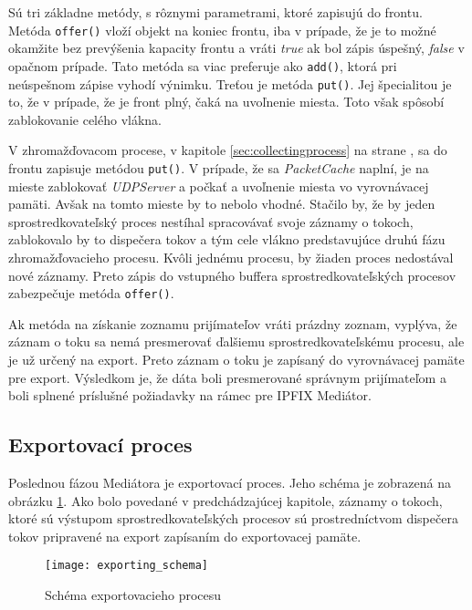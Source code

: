 Sú tri základne metódy, s rôznymi parametrami, ktoré zapisujú do frontu.
Metóda \verb|offer()| vloží objekt na koniec frontu, iba v prípade, že je to možné 
okamžite bez prevýšenia kapacity frontu a vráti \emph{true} ak bol zápis úspešný, \emph{false} v 
opačnom prípade. Tato metóda sa viac preferuje ako \verb|add()|, ktorá pri neúspešnom zápise 
vyhodí výnimku. Treťou je metóda \verb|put()|. Jej špecialitou je to, že v prípade, že je front plný,
čaká na uvoľnenie miesta. Toto však spôsobí zablokovanie celého vlákna. \citep{arrayblockingqueue}

V zhromažďovacom procese, v kapitole \ref{sec:collectingprocess} na strane \pageref{sec:collectingprocess},
sa do frontu zapisuje metódou \verb|put()|. V prípade, že sa \emph{PacketCache} naplní, je na mieste 
zablokovať \emph{UDPServer} a počkať a uvoľnenie miesta vo vyrovnávacej pamäti. Avšak na tomto mieste by 
to nebolo vhodné. Stačilo by, že by jeden sprostredkovateľský proces nestíhal spracovávať svoje záznamy
o tokoch, zablokovalo by to dispečera tokov a tým cele vlákno predstavujúce druhú fázu zhromažďovacieho
procesu. Kvôli jednému procesu, by žiaden proces nedostával nové záznamy. Preto zápis do vstupného buffera
sprostredkovateľských procesov zabezpečuje metóda \verb|offer()|.

Ak metóda na získanie zoznamu prijímateľov vráti prázdny zoznam, vyplýva, že záznam o toku 
sa nemá presmerovať ďalšiemu sprostredkovateľskému procesu, ale je už určený na export. Preto záznam o 
toku je zapísaný do vyrovnávacej pamäte pre export. Výsledkom je, že dáta boli presmerované správnym 
prijímateľom a boli splnené príslušné požiadavky na rámec pre IPFIX Mediátor.

\subsection{Exportovací proces}

Poslednou fázou Mediátora je exportovací proces. Jeho schéma je zobrazená na obrázku 
\ref{o:exporting_schema}. Ako bolo povedané v predchádzajúcej kapitole, záznamy 
o tokoch, ktoré sú výstupom  sprostredkovateľských procesov sú prostredníctvom dispečera 
tokov pripravené na export zapísaním do exportovacej pamäte.

\begin{figure}[ht!]
\centering
\texttt{[image: exporting\_schema]}
\caption{Schéma exportovacieho procesu}\label{o:exporting_schema}
\end{figure}

